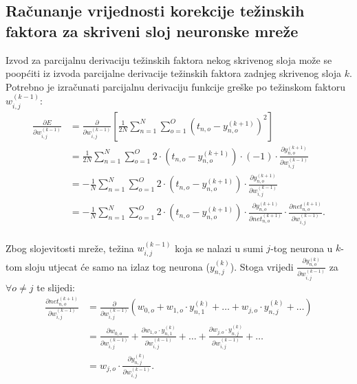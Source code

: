\subsection{Računanje vrijednosti korekcije težinskih faktora za skriveni sloj neuronske mreže}
\label{subsec:racunanje-vrijednosti-korekcije-tezinskih-faktora-za-skriveni-sloj-neuronske-mreze}
Izvod za parcijalnu derivaciju težinskih faktora nekog skrivenog sloja može se poopćiti iz izvoda parcijalne derivacije
težinskih faktora zadnjeg skrivenog sloja $k$. Potrebno je izračunati parcijalnu derivaciju funkcije greške po težinskom
faktoru $w_{i, j}^{(k - 1)}$:\\
\begin{align*}
    \frac{\partial E}{\partial w_{i, j}^{(k - 1)}} & = \frac{\partial}{\partial w_{i, j}^{(k - 1)}} \left[
    \frac{1}{2N} \sum_{n = 1}^{N} \sum_{o = 1}^{O} \left(t_{n, o} - y_{n, o}^{(k + 1)}\right)^2\right]\\
    & = \frac{1}{2N} \sum_{n = 1}^{N} \sum_{o = 1}^{O} 2 \cdot \left(t_{n, o} - y_{n, o}^{(k + 1)}\right) \cdot (-1)
    \cdot \frac{\partial y_{n, o}^{(k + 1)}}{\partial w_{i, j}^{(k - 1)}}\\
    & = -\frac{1}{N} \sum_{n = 1}^{N} \sum_{o = 1}^{O} 2 \cdot \left(t_{n, o} - y_{n, o}^{(k + 1)}\right) \cdot
    \frac{\partial y_{n, o}^{(k + 1)}}{\partial w_{i, j}^{(k - 1)}}\\
    & = -\frac{1}{N} \sum_{n = 1}^{N} \sum_{o = 1}^{O} 2 \cdot \left(t_{n, o} - y_{n, o}^{(k + 1)}\right) \cdot
    \frac{\partial y_{n, o}^{(k + 1)}}{\partial net_{n, o}^{(k + 1)}} \cdot
    \frac{\partial net_{n, o}^{(k + 1)}}{\partial w_{i, j}^{(k - 1)}}.
\end{align*}\\
Zbog slojevitosti mreže, težina $w_{i, j}^{(k - 1)}$ koja se nalazi u sumi $j$-tog neurona u $k$-tom sloju utjecat će
samo na izlaz tog neurona ($y_{n, j}^{(k)}$). Stoga vrijedi
$\frac{\partial y_{n, o}^{(k)}}{\partial w_{i, j}^{(k - 1)}}$ za $\forall o \neq j$ te slijedi:\\
\begin{align*}
    \frac{\partial net_{n, o}^{(k + 1)}}{\partial w_{i, j}^{(k - 1)}} & = \frac{\partial}{\partial w_{i, j}^{(k - 1)}}
    \left(w_{0, o} + w_{1, o} \cdot y_{n, 1}^{(k)} + \dots + w_{j, o} \cdot y_{n, j}^{(k)} + \dots\right)\\
    & = \frac{\partial w_{0, o}}{\partial w_{i, j}^{(k - 1)}} +
    \frac{\partial w_{1, o} \cdot y_{n, 1}^{(k)}}{\partial w_{i, j}^{(k - 1)}} + \dots +
    \frac{\partial w_{j, o} \cdot y_{n, j}^{(k)}}{\partial w_{i, j}^{(k - 1)}} + \dots\\
    & = w_{j, o} \cdot \frac{\partial y_{n, j}^{(k)}}{\partial w_{i, j}^{(k - 1)}}.
\end{align*}\\
